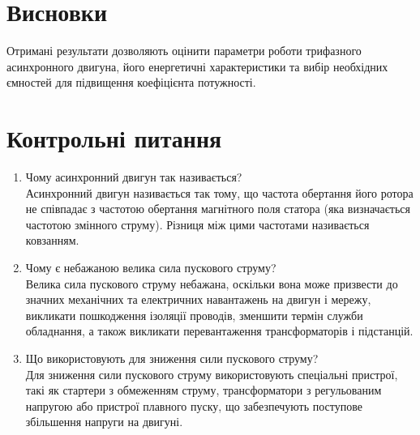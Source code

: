 \documentclass[a4paper]{article}
\begin{document}
\section*{Висновки}

Отримані результати дозволяють оцінити параметри роботи трифазного асинхронного двигуна, його енергетичні характеристики та вибір необхідних ємностей для підвищення коефіцієнта потужності.

\section*{Контрольні питання}
\begin{enumerate}
    \item Чому асинхронний двигун так називається? \\
    Асинхронний двигун називається так тому, що частота обертання його ротора не співпадає з частотою обертання магнітного поля статора (яка визначається частотою змінного струму). Різниця між цими частотами називається ковзанням.
    
    \item Чому є небажаною велика сила пускового струму? \\
    Велика сила пускового струму небажана, оскільки вона може призвести до значних механічних та електричних навантажень на двигун і мережу, викликати пошкодження ізоляції проводів, зменшити термін служби обладнання, а також викликати перевантаження трансформаторів і підстанцій.
    
    \item Що використовують для зниження сили пускового струму? \\
    Для зниження сили пускового струму використовують спеціальні пристрої, такі як стартери з обмеженням струму, трансформатори з регульованим напругою або пристрої плавного пуску, що забезпечують поступове збільшення напруги на двигуні.
\end{enumerate}
\end{document}
